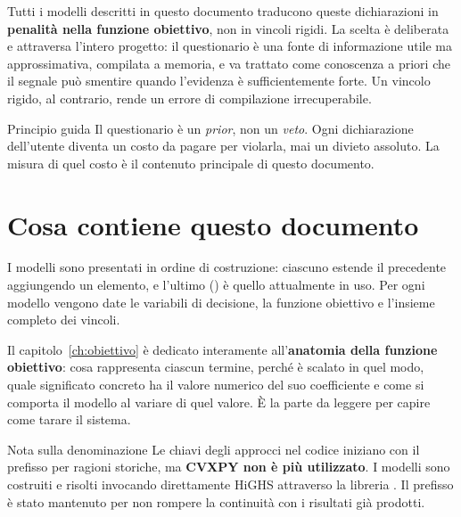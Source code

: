 Tutti i modelli descritti in questo documento traducono queste dichiarazioni in
\textbf{penalità nella funzione obiettivo}, non in vincoli rigidi. La scelta è deliberata e
attraversa l'intero progetto: il questionario è una fonte di informazione utile ma
approssimativa, compilata a memoria, e va trattato come conoscenza a priori che il segnale può
smentire quando l'evidenza è sufficientemente forte. Un vincolo rigido, al contrario, rende un
errore di compilazione irrecuperabile.

\begin{notebox}{Principio guida}
Il questionario è un \emph{prior}, non un \emph{veto}. Ogni dichiarazione dell'utente diventa un
costo da pagare per violarla, mai un divieto assoluto. La misura di quel costo è il contenuto
principale di questo documento.
\end{notebox}

\section{Cosa contiene questo documento}

I modelli sono presentati in ordine di costruzione: ciascuno estende il precedente aggiungendo
un elemento, e l'ultimo () è quello attualmente in uso. Per ogni
modello vengono date le variabili di decisione, la funzione obiettivo e l'insieme completo dei
vincoli.

Il capitolo~\ref{ch:obiettivo} è dedicato interamente all'\textbf{anatomia della funzione
obiettivo}: cosa rappresenta ciascun termine, perché è scalato in quel modo, quale significato
concreto ha il valore numerico del suo coefficiente e come si comporta il modello al variare di
quel valore. È la parte da leggere per capire come tarare il sistema.

\begin{notebox}{Nota sulla denominazione}
Le chiavi degli approcci nel codice iniziano con il prefisso  per ragioni
storiche, ma \textbf{CVXPY non è più utilizzato}. I modelli sono costruiti e risolti invocando
direttamente HiGHS attraverso la libreria . Il prefisso è stato mantenuto per non
rompere la continuità con i risultati già prodotti.
\end{notebox}
